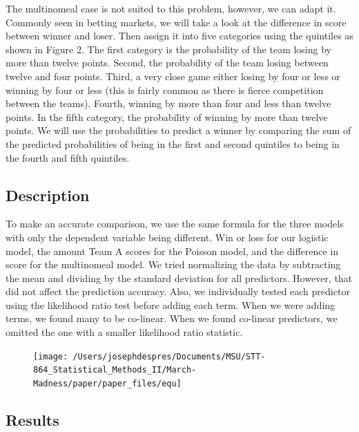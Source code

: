 \documentclass[
  man,floatsintext]{apa6}
\begin{document}
The multinomeal case is not suited to this problem, however, we can adapt it. Commonly seen in betting markets, we will take a look at the difference in score between winner and loser. Then assign it into five categories using the quintiles as shown in Figure 2. The first category is the probability of the team losing by more than twelve points. Second, the probability of the team losing between twelve and four points. Third, a very close game either losing by four or less or winning by four or less (this is fairly common as there is fierce competition between the teams). Fourth, winning by more than four and less than twelve points. In the fifth category, the probability of winning by more than twelve points. We will use the probabilities to predict a winner by comparing the sum of the predicted probabilities of being in the first and second quintiles to being in the fourth and fifth quintiles.

\hypertarget{description}{%
\subsection{Description}\label{description}}

To make an accurate comparison, we use the same formula for the three models with only the dependent variable being different. Win or loss for our logistic model, the amount Team A scores for the Poisson model, and the difference in score for the multinomeal model. We tried normalizing the data by subtracting the mean and dividing by the standard deviation for all predictors. However, that did not affect the prediction accuracy. Also, we individually tested each predictor using the likelihood ratio test before adding each term. When we were adding terms, we found many to be co-linear. When we found co-linear predictors, we omitted the one with a smaller likelihood ratio statistic.

\begin{figure}
\texttt{[image: /Users/josephdespres/Documents/MSU/STT-864\_Statistical\_Methods\_II/March-Madness/paper/paper\_files/equ]} \end{figure}

\hypertarget{results}{%
\subsection{Results}\label{results}}
\end{document}
